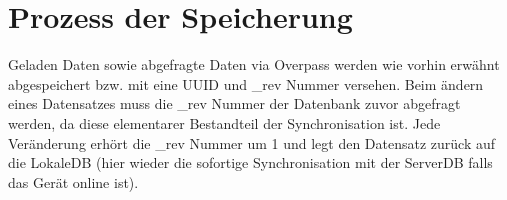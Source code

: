 \section{Prozess der Speicherung}
\label{sec:speicherung}
Geladen Daten sowie abgefragte Daten via Overpass werden wie vorhin erwähnt abgespeichert bzw. mit eine UUID und _rev Nummer versehen. Beim ändern eines Datensatzes muss die _rev Nummer der Datenbank zuvor abgefragt werden, da diese elementarer Bestandteil der Synchronisation ist. Jede Veränderung erhört die _rev Nummer um 1 und legt den Datensatz zurück auf die LokaleDB (hier wieder die sofortige Synchronisation mit der ServerDB falls das Gerät online ist).


